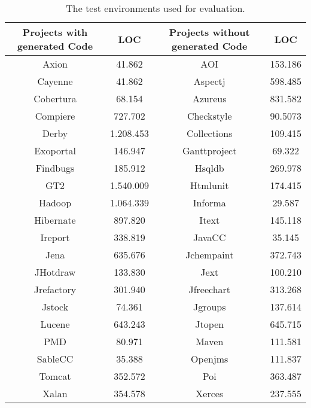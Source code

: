 \begin{table}
	\caption{The test environments used for evaluation. \cite{Bernwieser2014}}
	\label{table:qualitasCorpusOverview}
	\begin{tabularx}{\textwidth}{Cc||Cc}
		\textbf{Projects with generated Code} & \textbf{LOC} & \textbf{Projects without generated Code} & \textbf{LOC} \\
		\hline
		Axion & 41.862 & AOI & 153.186 \\
		Cayenne & 41.862 & Aspectj & 598.485 \\
		Cobertura & 68.154 & Azureus & 831.582 \\
		Compiere & 727.702 & Checkstyle & 90.5073 \\
		Derby & 1.208.453 & Collections & 109.415 \\
		Exoportal & 146.947 & Ganttproject & 69.322 \\
		Findbugs & 185.912 & Hsqldb & 269.978 \\
		GT2 & 1.540.009 & Htmlunit & 174.415 \\
		Hadoop & 1.064.339 & Informa & 29.587 \\
		Hibernate & 897.820 & Itext & 145.118 \\
		Ireport & 338.819 & JavaCC & 35.145 \\
		Jena & 635.676 & Jchempaint & 372.743 \\
		JHotdraw & 133.830 & Jext & 100.210 \\
		Jrefactory & 301.940 & Jfreechart & 313.268 \\
		Jstock & 74.361 & Jgroups & 137.614 \\
		Lucene & 643.243 & Jtopen & 645.715 \\
		PMD & 80.971 & Maven & 111.581 \\
		SableCC & 35.388 & Openjms & 111.837 \\
		Tomcat & 352.572 & Poi & 363.487 \\
		Xalan & 354.578 & Xerces & 237.555 \\
	\end{tabularx}
\end{table}